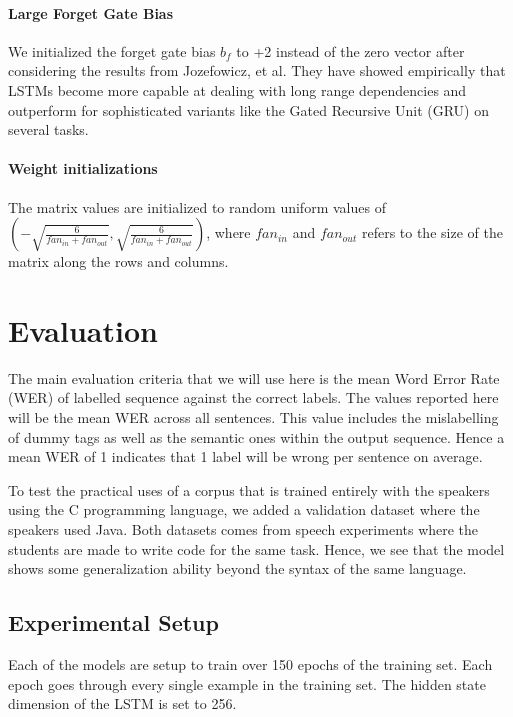 \documentclass[fyp]{socreport}
\begin{document}
\subsubsection{Large Forget Gate Bias} We initialized the forget gate bias
$b_f$ to +2 instead of the zero vector after considering the results from
Jozefowicz, et al\cite{ICML2015JozefowiczZS}. They have showed empirically that
LSTMs become more capable at dealing with long range dependencies and outperform
for sophisticated variants like the Gated Recursive Unit (GRU) on several
tasks.

\subsubsection{Weight initializations} The matrix values are initialized to
random uniform values of \\$(-\sqrt{\frac{6}{fan_{in} + fan_{out}}},
\sqrt{\frac{6}{fan_{in} + fan_{out}}})$, where $fan_{in}$ and $fan_{out}$ refers
to the size of the matrix along the rows and columns.


\chapter{Evaluation}
The main evaluation criteria that we will use here is the mean Word Error Rate
(WER) of labelled sequence against the correct labels. The values reported here
will be the mean WER across all sentences. This value includes the mislabelling
of dummy tags as well as the semantic ones within the output sequence. Hence a
mean WER of 1 indicates that 1 label will be wrong per sentence on average.

To test the practical uses of a corpus that is trained entirely with the speakers
using the C programming language, we added a validation dataset where the speakers
used Java. Both datasets comes from speech experiments where the students are
made to write code for the same task. Hence, we see that the model shows some
generalization ability beyond the syntax of the same language.



\section{Experimental Setup}
Each of the models are setup to train over 150 epochs of the training set. Each
epoch goes through every single example in the training set. The hidden state
dimension of the LSTM is set to 256.
\end{document}
